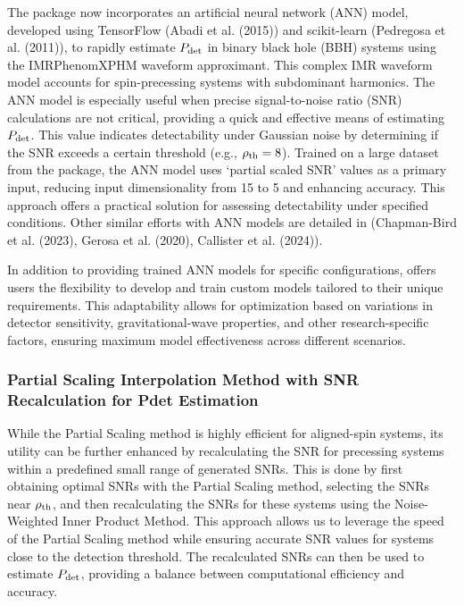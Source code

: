 \documentclass[10pt,a4paper,onecolumn]{article}
\let\textttOrig=\texttt
\def\texttt#1{\expandafter\textttOrig{\seqsplit{#1}}}
\begin{document}
The \texttt{gwsnr} package now incorporates an artificial neural network
(ANN) model, developed using TensorFlow (Abadi et al. (2015)) and
scikit-learn (Pedregosa et al. (2011)), to rapidly estimate
\(P_{\rm det}\) in binary black hole (BBH) systems using the
IMRPhenomXPHM waveform approximant. This complex IMR waveform model
accounts for spin-precessing systems with subdominant harmonics. The ANN
model is especially useful when precise signal-to-noise ratio (SNR)
calculations are not critical, providing a quick and effective means of
estimating \(P_{\rm det}\). This value indicates detectability under
Gaussian noise by determining if the SNR exceeds a certain threshold
(e.g., \(\rho_{\rm th}=8\)). Trained on a large dataset from the
\texttt{ler} package, the ANN model uses `partial scaled SNR' values as
a primary input, reducing input dimensionality from 15 to 5 and
enhancing accuracy. This approach offers a practical solution for
assessing detectability under specified conditions. Other similar
efforts with ANN models are detailed in (Chapman-Bird et al. (2023),
Gerosa et al. (2020), Callister et al. (2024)).

In addition to providing trained ANN models for specific configurations,
\texttt{gwsnr} offers users the flexibility to develop and train custom
models tailored to their unique requirements. This adaptability allows
for optimization based on variations in detector sensitivity,
gravitational-wave properties, and other research-specific factors,
ensuring maximum model effectiveness across different scenarios.

\subsubsection{Partial Scaling Interpolation Method with SNR
Recalculation for Pdet
Estimation}\label{partial-scaling-interpolation-method-with-snr-recalculation-for-pdet-estimation}

While the Partial Scaling method is highly efficient for aligned-spin
systems, its utility can be further enhanced by recalculating the SNR
for precessing systems within a predefined small range of generated
SNRs. This is done by first obtaining optimal SNRs with the Partial
Scaling method, selecting the SNRs near \(\rho_{\rm th}\), and then
recalculating the SNRs for these systems using the Noise-Weighted Inner
Product Method. This approach allows us to leverage the speed of the
Partial Scaling method while ensuring accurate SNR values for systems
close to the detection threshold. The recalculated SNRs can then be used
to estimate \(P_{\rm det}\), providing a balance between computational
efficiency and accuracy.
\end{document}
